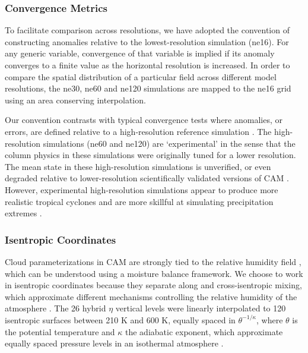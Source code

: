 \subsubsection{Convergence Metrics}
To facilitate comparison across resolutions, we have adopted the convention of constructing anomalies relative to the lowest-resolution simulation (ne16). For any generic variable, convergence of that variable is implied if its anomaly converges to a finite value as the horizontal resolution is increased. In order to compare the spatial distribution of a particular field across different model resolutions, the ne30, ne60 and ne120 simulations are mapped to the ne16 grid using an area conserving interpolation. 

Our convention contrasts with typical convergence tests where anomalies, or errors, are defined relative to a high-resolution reference simulation \citep{JW2006QJR,W2008TELLUS}. The high-resolution simulations (ne60 and ne120) are `experimental’ in the sense that the column physics in these simulations were originally tuned for a lower resolution. The mean state in these high-resolution simulations is unverified, or even degraded relative to lower-resolution scientifically validated versions of CAM \citep{WETAL2014JAMES}. However, experimental high-resolution simulations appear to produce more realistic tropical cyclones \citep{WETAL2014JAMES} and are more skillful at simulating precipitation extremes \citep{WETAL2014JAMES,OETAL2016JAMES}.

\subsubsection{Isentropic Coordinates}
Cloud parameterizations in CAM are strongly tied to the relative humidity field \citep{CAM4,CAM5,PETAL2014JCLIM}, which can be understood using a moisture balance framework. We choose to work in isentropic coordinates because they separate along and cross-isentropic mixing, which approximate different mechanisms controlling the relative humidity of the atmosphere \citep{SETAL2006JCLIM}. The 26 hybrid $\eta$ vertical levels were linearly interpolated to 120 isentropic surfaces between 210 K and 600 K, equally spaced in $\theta^{-1/\kappa}$, where $\theta$ is the potential temperature and $\kappa$ the adiabatic exponent, which approximate equally spaced pressure levels in an isothermal atmosphere \citep{SETAL2006JCLIM}.

